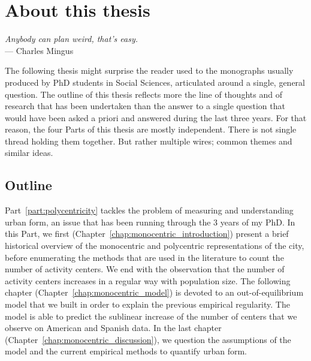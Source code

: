 

\chapter{About this thesis}
\label{chap:methodology}


\begin{flushright}{\slshape    
Anybody can plan weird, that's easy.} \\ \medskip
--- Charles Mingus
\end{flushright}


\bigskip 


The following thesis might surprise the reader used to the monographs usually
produced by PhD students in Social Sciences, articulated around a single,
general question. The outline of this thesis reflects more the
line of thoughts and of research that has been undertaken than the answer to a
single question that would have been asked a priori and answered during the
last three years. For that reason, the four Parts of this thesis are mostly
independent. There is not single thread holding them together. But rather multiple
wires; common themes and similar ideas. 

\section{Outline}

Part~\ref{part:polycentricity} tackles the problem of measuring and
understanding urban form, an issue that has been running through the $3$ years
of my PhD. In this Part, we first (Chapter~\ref{chap:monocentric_introduction})
present a brief historical overview of the monocentric and polycentric
representations of the city, before enumerating the methods that are used in the
literature to count the number of activity centers. We end with the observation
that the number of activity centers increases in a regular way with population
size. The following chapter (Chapter~\ref{chap:monocentric_model}) is devoted to
an out-of-equilibrium model that we built in order to explain the previous
empirical regularity. The model is able to predict the sublinear increase of the
number of centers that we observe on American and Spanish data. In the last
chapter (Chapter~\ref{chap:monocentric_discussion}), we question the assumptions
of the model and the current empirical methods to quantify urban form.\\

